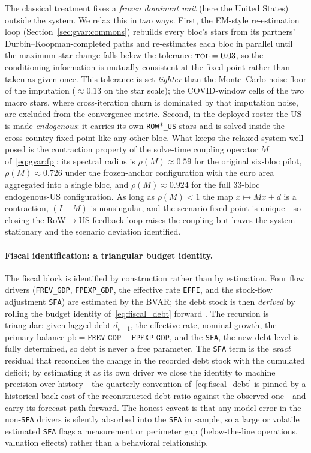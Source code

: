 \documentclass[11pt]{article}
\theoremstyle{definition}
\theoremstyle{remark}
\begin{document}
The classical treatment fixes a \emph{frozen dominant unit} (here the United
States) outside the system. We relax this in two ways. First, the EM-style
re-estimation loop (Section~\ref{sec:gvar:commons}) rebuilds every bloc's stars
from its partners' Durbin--Koopman-completed paths and re-estimates each bloc in
parallel until the maximum star change falls below the tolerance
$\textsc{tol}=0.03$, so the conditioning information is mutually consistent at
the fixed point rather than taken as given once. This tolerance is set
\emph{tighter} than the Monte~Carlo noise floor of the imputation
($\approx 0.13$ on the star scale); the COVID-window cells of the two macro
stars, where cross-iteration churn is dominated by that imputation noise, are
excluded from the convergence metric. Second, in the deployed roster the US is
made \emph{endogenous}: it carries its own \texttt{ROW$*$\_US} stars and is
solved inside the cross-country fixed point like any other bloc. What keeps the
relaxed system well posed is the contraction property of the solve-time
coupling operator $M$ of~\eqref{eq:gvar:fp}: its spectral radius is
$\rho(M)\approx 0.59$ for the original six-bloc pilot,
$\rho(M)\approx 0.726$ under the frozen-anchor configuration with the euro area
aggregated into a single bloc, and $\rho(M)\approx 0.924$ for the full
$33$-bloc endogenous-US configuration. As long as $\rho(M)<1$ the map
$x\mapsto Mx+d$ is a contraction, $(I-M)$ is nonsingular, and the scenario fixed
point is unique---so closing the RoW$\to$US feedback loop raises the coupling
but leaves the system stationary and the scenario deviation identified.

\paragraph{Fiscal identification: a triangular budget identity.}
The fiscal block is identified by construction rather than by estimation. Four
flow drivers (\texttt{FREV\_GDP}, \texttt{FPEXP\_GDP}, the effective rate
\texttt{EFFI}, and the stock-flow adjustment \texttt{SFA}) are estimated by the
BVAR; the debt stock is then \emph{derived} by rolling the budget identity
of~\eqref{eq:fiscal_debt} forward
\citep{Escolano2010, IMF2013DSA}. The recursion is triangular: given lagged
debt $d_{t-1}$, the effective rate, nominal growth, the primary balance
$\mathrm{pb}=\texttt{FREV\_GDP}-\texttt{FPEXP\_GDP}$, and the \texttt{SFA}, the
new debt level is fully determined, so debt is never a free parameter.
The \texttt{SFA} term is the \emph{exact} residual that reconciles the change in
the recorded debt stock with the cumulated deficit; by estimating it as its own
driver we close the identity to machine precision over history---the quarterly
convention of~\eqref{eq:fiscal_debt} is pinned by a historical back-cast of the
reconstructed debt ratio against the observed one---and carry its forecast path
forward. The honest caveat is that any model error in the non-\texttt{SFA}
drivers is silently absorbed into the \texttt{SFA} in sample, so a large or
volatile estimated \texttt{SFA} flags a measurement or perimeter gap
(below-the-line operations, valuation effects) rather than a behavioral
relationship.
\end{document}
